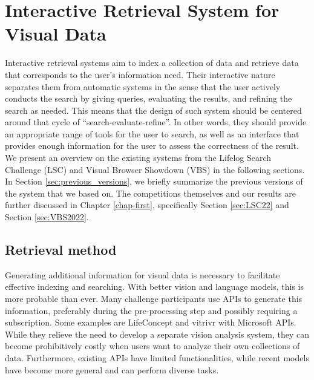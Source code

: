\section{Interactive Retrieval System for Visual Data}

Interactive retrieval systems aim to index a collection of data and retrieve data that corresponds to the user's information need. Their interactive nature separates them from automatic systems in the sense that the user actively conducts the search by giving queries, evaluating the results, and refining the search as needed. This means that the design of such system should be centered around that cycle of ``search-evaluate-refine''. In other words, they should provide an appropriate range of tools for the user to search, as well as an interface that provides enough information for the user to assess the correctness of the result. We present an overview on the existing systems from the Lifelog Search Challenge (LSC) and Visual Browser Showdown (VBS) in the following sections. In Section \ref{sec:previous_versions}, we briefly summarize the previous versions of the system that we based on. The competitions themselves and our results are further discussed in Chapter \ref{chap-first}, specifically Section \ref{sec:LSC22} and Section \ref{sec:VBS2022}.

\subsection{Retrieval method}


Generating additional information for visual data is necessary to facilitate effective indexing and searching. With better vision and language models, this is more probable than ever. Many challenge participants use APIs to generate this information, preferably during the pre-processing step and possibly requiring a subscription. Some examples are LifeConcept \cite{ang_lifeconcept_2021} and vitrivr \cite{heller_vitrivr_2022} with Microsoft APIs. While they relieve the need to develop a separate vision analysis system, they can become prohibitively costly when users want to analyze their own collections of data. Furthermore, existing APIs have limited functionalities, while recent models have become more general and can perform diverse tasks.

